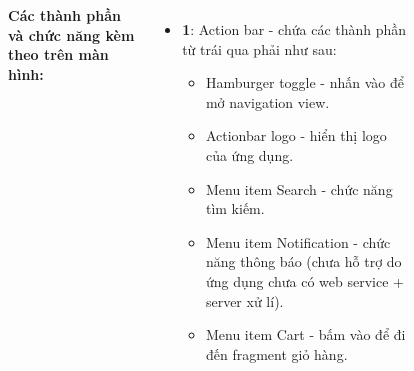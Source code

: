 \documentclass{beamer}
\begin{document}
\begin{frame}
\begin{columns}
\begin{figure}
        \end{figure}
        \indent \textbf{Các thành phần và chức năng kèm theo trên màn hình:}
        \begin{itemize}
            \item \textbf{1}: Action bar - chứa các thành phần từ trái qua phải như sau:
                  \begin{itemize}
                      \item Hamburger toggle - nhấn vào để mở navigation view.
                      \item Actionbar logo - hiển thị logo của ứng dụng.
                      \item Menu item Search - chức năng tìm kiếm.
                      \item Menu item Notification - chức năng thông báo (chưa hỗ trợ do ứng dụng chưa có web service + server xử lí).
                      \item Menu item Cart - bấm vào để đi đến fragment giỏ hàng.
                  \end{itemize}
        \end{itemize}
    \end{columns}
\end{frame}
\end{document}
